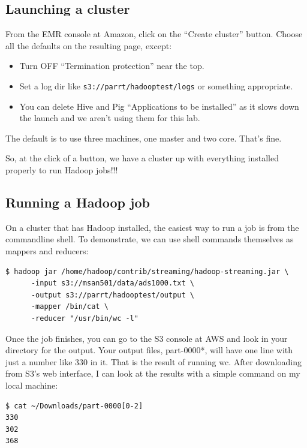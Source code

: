 \begin{fullwidth}
\subsection{Launching a cluster}

From the EMR console at Amazon, click on the ``Create cluster'' button. Choose all the defaults on the resulting page, except:

\begin{itemize}
\item Turn OFF ``Termination protection'' near the top.
\item Set a log dir like {\tt s3://parrt/hadooptest/logs} or something appropriate.
\item You can delete Hive and Pig ``Applications to be installed'' as it slows down the launch and we aren't using  them for this lab.
\end{itemize}

\noindent The default is to use three machines, one master and two core. That's fine.

So, at the click of a button, we have a cluster up with everything installed properly to run Hadoop jobs!!!
 
\subsection{Running a Hadoop job}

On a cluster that has Hadoop installed, the easiest way to run a job is from the commandline shell. To demonstrate, we can use shell commands themselves as mappers and reducers:

\begin{lstlisting}[style=BashInputStyle]
$ hadoop jar /home/hadoop/contrib/streaming/hadoop-streaming.jar \
      -input s3://msan501/data/ads1000.txt \
      -output s3://parrt/hadooptest/output \
      -mapper /bin/cat \
      -reducer "/usr/bin/wc -l"	
\end{lstlisting}

\noindent Once the job finishes, you can go to the S3 console at AWS and look in your directory for the output. Your output files, part-0000*, will have one line with just a number like 330 in it. That is the result of running wc. After downloading from S3's web interface, I can look at the results with a simple command on my local machine:

\begin{lstlisting}[style=BashInputStyle]
$ cat ~/Downloads/part-0000[0-2]
330	
302	
368
\end{lstlisting}


\end{fullwidth}
